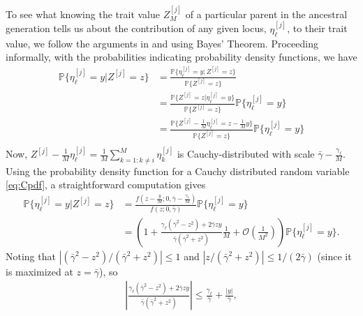 \documentclass{article}
\renewcommand{\P}{\mathbb{P}}
\newcommand{\1}{\mathbbm{1}}
\newcommand{\Oh}{{\mathcal O}}
\theoremstyle{remark}
\theoremstyle{definition}
\begin{document}
To see what knowing the trait value $Z^{[j]}_{M}$ 
of a particular parent in the ancestral generation
tells us about the contribution of any given locus, $\eta^{[j]}_{\ell}$, to their trait value,
we follow the arguments in  \citet{fisher1918correlation} and \citet{barton2017infinitesimal} using Bayes' Theorem.
Proceeding informally, with the probabilities indicating probability density functions, we have 
\begin{align*}
    \P\{\eta^{[j]}_{\ell} = y \vert Z^{[j]} = z\} &= \frac{\P\{\eta^{[j]}_{\ell} = y; Z^{[j]} = z\}}{\P\{Z^{[j]} = z\}}\\
        &= \frac{\P\{Z^{[j]} = z\vert\eta^{[j]}_{\ell} = y\}}{\P\{Z^{[j]} = z\}}\P\{\eta^{[j]}_{\ell} = y\}\\
        &=  \frac{\P\{Z^{[j]} -\frac{1}{M} \eta^{[j]}_{\ell} = z - \frac{1}{M} y\}}{\P\{Z^{[j]} = z\}}\P\{\eta^{[j]}_{\ell} = y\}\\
\end{align*}
Now, $Z^{[j]} -\frac{1}{M} \eta^{[j]}_{\ell} = \frac{1}{M} \sum_{k = 1 : k \neq i}^{M} \eta^{[j]}_{k}$ is Cauchy-distributed with scale $\bar{\gamma} - \frac{\gamma_{\ell}}{M}$.  Using the probability density function for a Cauchy distributed random variable \eqref{eq:Cpdf}, a straightforward computation gives
\begin{align*}
    \P\{\eta^{[j]}_{\ell} = y \vert Z^{[j]} = z\}
    &=
    \frac{f\left(z - \frac{y}{M} ;0,\bar{\gamma}-\frac{\gamma_{\ell}}{M}\right)}{f(z;0,\bar{\gamma})} \P\{\eta^{[j]}_{\ell} = y\}\\
    &=
    \left(1
        +
        \frac{\gamma_{\ell}(\bar{\gamma}^{2}-z^{2})+2\bar{\gamma} zy}{\bar{\gamma}(\bar{\gamma}^{2}+z^{2})}
        \frac{1}{M}
        + \Oh\left(\frac{1}{M^{2}}\right)\right)
        \P\{\eta^{[j]}_{\ell} = y\}.
\end{align*}
Noting that $|(\bar{\gamma}^2 - z^2)/(\bar{\gamma}^2 + z^2)| \le 1$
and $|z/(\bar{\gamma}^2 + z^2)| \le 1/(2 \bar{\gamma})$
(since it is maximized at $z = \bar{\gamma}$),
so
\begin{align*}
        \left|
        \frac{\gamma_{\ell}(\bar{\gamma}^{2}-z^{2})+2\bar{\gamma}zy}{\bar{\gamma}(\bar{\gamma}^{2}+z^{2})}
        \right|
        \le \frac{\gamma_{\ell}}{\bar{\gamma}} + \frac{|y|}{\bar{\gamma}},
\end{align*}
\end{document}
